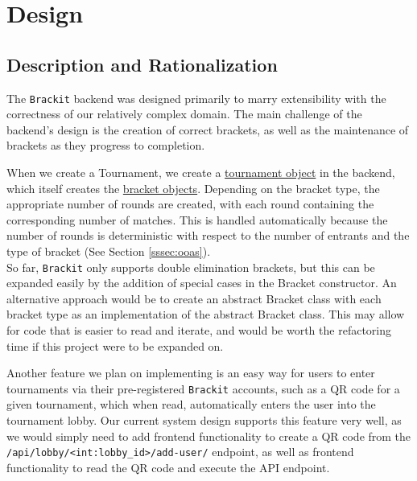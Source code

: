 \documentclass{article}
\begin{document}
\section{Design}
\subsection{Description and Rationalization}
The \texttt{Brackit} backend was designed primarily to marry extensibility with the correctness of 
our relatively complex domain. The main challenge of the backend's design is the creation of 
correct brackets, as well as the maintenance of brackets as they progress to completion.

When we create a Tournament, we create a \href{https://github.com/alextrosta/brackit/blob/master/backend/tournament.py#L18}{tournament object} in the backend, which itself creates
the \href{https://github.com/alextrosta/brackit/blob/master/backend/tournament.py#L59}{bracket objects}. Depending on the bracket type, the appropriate number of rounds are created, 
with each round containing the corresponding number of matches. This is handled automatically because
the number of rounds is deterministic with respect to the number of entrants and the type of bracket (See Section \ref{sssec:ooas}).\\
So far, \texttt{Brackit} only supports double elimination brackets, but this can be expanded easily by the addition of special cases in the Bracket constructor. An alternative approach would be to create an abstract Bracket
class with each bracket type as an implementation of the abstract Bracket class. This may allow for 
code that is easier to read and iterate, and would be worth the refactoring time if this project were 
to be expanded on. 

Another feature we plan on implementing is an easy way for users to enter tournaments via their pre-registered \texttt{Brackit} accounts,
such as a QR code for a given tournament, which when read, automatically enters the user into the tournament lobby. Our current 
system design supports this feature very well, as we would simply need to add frontend functionality to create a QR code from the 
\texttt{/api/lobby/<int:lobby_id>/add-user/} endpoint, as well as frontend functionality to read the QR code and execute the API endpoint.
\end{document}
